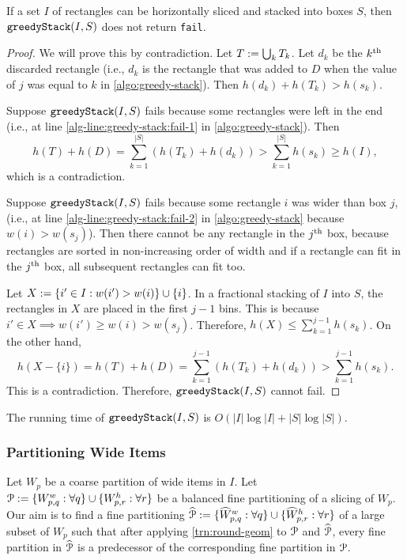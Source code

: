 \begin{lemma}
\label{lem:greedy-stack-nofail}
If a set $I$ of rectangles can be horizontally sliced and stacked into boxes $S$,
then $\operatorname{\mathtt{greedyStack}}(I, S)$ does not return \texttt{fail}.
\end{lemma}
\begin{proof}
We will prove this by contradiction.
Let $T := \bigcup_k T_k$.
Let $d_k$ be the $k^{\textrm{th}}$ discarded rectangle
(i.e., $d_k$ is the rectangle that was added to $D$
when the value of $j$ was equal to $k$ in \cref{algo:greedy-stack}).
Then $h(d_k) + h(T_k) > h(s_k)$.

Suppose $\operatorname{\mathtt{greedyStack}}(I, S)$ fails because some rectangles were left in the end
(i.e., at line \ref{alg-line:greedy-stack:fail-1} in \cref{algo:greedy-stack}). Then
\[ h(T) + h(D) = \sum_{k=1}^{|S|} (h(T_k) + h(d_k))
> \sum_{k=1}^{|S|} h(s_k) \ge h(I), \]
which is a contradiction.

Suppose $\operatorname{\mathtt{greedyStack}}(I, S)$ fails because some rectangle $i$ was wider than box $j$,
(i.e., at line \ref{alg-line:greedy-stack:fail-2}
in \cref{algo:greedy-stack} because $w(i) > w(s_j)$).
Then there cannot be any rectangle in the $j^{\textrm{th}}$ box, because rectangles are sorted
in non-increasing order of width and if a rectangle can fit in the $j^{\textrm{th}}$ box,
all subsequent rectangles can fit too.

Let $X := \{i' \in I: w(i') > w(i)\} \cup \{i\}$.
In a fractional stacking of $I$ into $S$, the rectangles in $X$ are placed in the first $j-1$ bins.
This is because $i' \in X \implies w(i') \ge w(i) > w(s_j)$.
Therefore, $h(X) \le \sum_{k=1}^{j-1} h(s_k)$. On the other hand,
\[ h(X-\{i\}) = h(T) + h(D) = \sum_{k=1}^{j-1} (h(T_k) + h(d_k)) > \sum_{k=1}^{j-1} h(s_k). \]
This is a contradiction. Therefore, $\operatorname{\mathtt{greedyStack}}(I, S)$ cannot fail.
\end{proof}

\begin{claim}
The running time of $\operatorname{\mathtt{greedyStack}}(I, S)$ is $O(|I|\log|I| + |S|\log|S|)$.
\end{claim}

\subsubsection{Partitioning Wide Items}
\label{sec:gv-rbbp:part-wide-details}

Let $W_p$ be a coarse partition of wide items in $I$.
Let $\mathcal{P} := \{W_{p,q}^w: \forall q\} \cup \{W_{p,r}^h: \forall r\}$ be
a balanced fine partitioning of a slicing of $W_p$.
Our aim is to find a fine partitioning
$\widehat{\mathcal{P}} := \{\widehat{W}_{p,q}^w: \forall q\} \cup \{\widehat{W}_{p,r}^h: \forall r\}$
of a large subset of $W_p$ such that
after applying \cref{trn:round-geom} to $\mathcal{P}$ and $\widehat{\mathcal{P}}$,
every fine partition in $\widehat{\mathcal{P}}$ is a predecessor of
the corresponding fine partition in $\mathcal{P}$.


